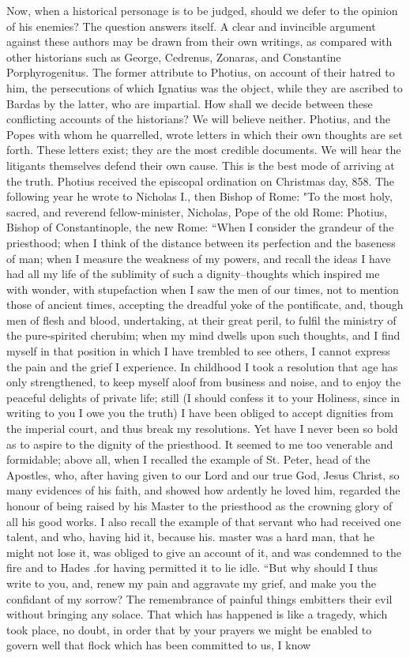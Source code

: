 Now, when a historical personage is to be judged, should we defer to the opinion of his enemies? The question answers itself. A clear and invincible argument against these authors may be drawn from their own writings, as compared with other historians such as George, Cedrenus, Zonaras, and Constantine Porphyrogenitus. The former attribute to Photius, on account of their hatred to him, the persecutions of which Ignatius was the object, while they are ascribed to Bardas by the latter, who are impartial. How shall we decide between these conflicting accounts of the historians? We will believe neither. Photius, and the Popes with whom he quarrelled, wrote letters in which their own thoughts are set forth. These letters exist; they are the most credible documents. We will hear the litigants themselves defend their own cause. This is the best mode of arriving at the truth. Photius received the episcopal ordination on Christmas day, 858. The following year he wrote to Nicholas I., then Bishop of Rome: "To the most holy, sacred, and reverend fellow-minister, Nicholas, Pope of the old Rome: Photius, Bishop of Constantinople, the new Rome: “When I consider the grandeur of the priesthood; when I think of the distance between its perfection and the baseness of man; when I measure the weakness of my powers, and recall the ideas I have had all my life of the sublimity of such a dignity--thoughts which inspired me with wonder, with stupefaction when I saw the men of our times, not to mention those of ancient times, accepting the dreadful yoke of the pontificate, and, though men of flesh and blood, undertaking, at their great peril, to fulfil the ministry of the pure-spirited cherubim; when my mind dwells upon such thoughts, and I find myself in that position in which I have trembled to see others, I cannot express the pain and the grief I experience. In childhood I took a resolution that age has only strengthened, to keep myself aloof from business and noise, and to enjoy the peaceful delights of private life; still (I should confess it to your Holiness, since in writing to you I owe you the truth) I have been obliged to accept dignities from the imperial court, and thus break my resolutions. Yet have I never been so bold as to aspire to the dignity of the priesthood. It seemed to me too venerable and formidable; above all, when I recalled the example of St. Peter, head of the Apostles, who, after having given to our Lord and our true God, Jesus Christ, so many evidences of his faith, and showed how ardently he loved him, regarded the honour of being raised by his Master to the priesthood as the crowning glory of all his good works. I also recall the example of that servant who had received one talent, and who, having hid it, because his. master was a hard man, that he might not lose it, was obliged to give an account of it, and was condemned to the fire and to Hades .for having permitted it to lie idle. “But why should I thus write to you, and, renew my pain and aggravate my grief, and make you the confidant of my sorrow? The remembrance of painful things embitters their evil without bringing any solace. That which has happened is like a tragedy, which took place, no doubt, in order that by your prayers we might be enabled to govern well that flock which has been committed to us, I know 